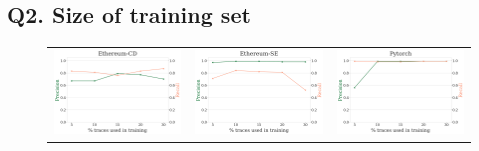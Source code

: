 \subsection{Q2. Size of training set}
\label{sec:q2}
\begin{figure}[!htbp]

	\centering
	\setlength{\tabcolsep}{1em}
	\setlength{\extrarowheight}{20pt}
	\begin{tabular}{ccc}
        \includegraphics[scale=0.18]{6_9_eth_prec_rec_cd19_1.png}
        &
        \includegraphics[scale=0.18]{6_9_eth_prec_rec_se13_1.png}
        &
        \includegraphics[scale=0.18]{6_26_pytorch_prec_rec.png}

\end{tabular}
\end{figure}
